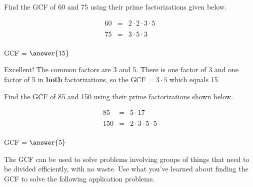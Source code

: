 \documentclass{ximera}[font=12pt]  %
\begin{document}
\begin{problem}
Find the GCF of 60 and 75 using their prime factorizations given below.

\begin{eqnarray*}
60 &=& 2 \cdot 2 \cdot 3 \cdot 5 \\
   & & \\
75 &=& 3 \cdot 5 \cdot 3 \\
\end{eqnarray*}

GCF = $\answer{15}$ 

\begin{feedback}
Excellent!  The common factors are 3 and 5.  There is one factor of 3 and one factor of 5 in \textbf{both} factorizations, so the GCF = $3 \cdot 5$ which equals 15.
\end{feedback}

\end{problem}


\begin{problem}
Find the GCF of 85 and 150 using their prime factorizations shown below.


\begin{eqnarray*}
85 &=& 5 \cdot 17 \\
   & & \\
150 &=& 2 \cdot 3 \cdot 5 \cdot 5 \\
\end{eqnarray*}


GCF = $\answer{5}$

\end{problem}


The GCF can be used to solve problems involving groups of things that need to be divided efficiently, with no waste.  Use what you've learned
about finding the GCF to solve the following application problems.
\end{document}
